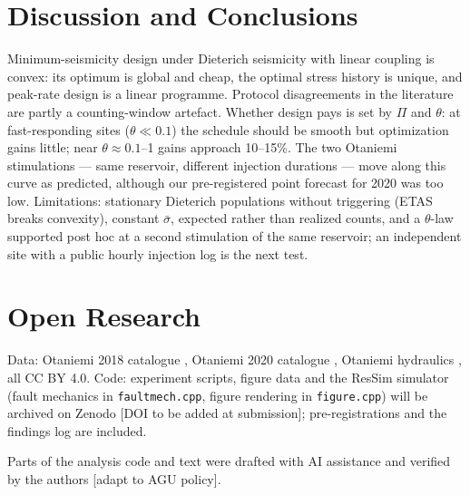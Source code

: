 \documentclass[draft]{agujournal2019}
\begin{document}
\section{Discussion and Conclusions}
Minimum-seismicity design under Dieterich seismicity with linear coupling is convex: its optimum is global and cheap, the optimal stress
history is unique, and peak-rate design is a linear programme. Protocol disagreements in the literature are partly a counting-window
artefact. Whether design pays is set by $\Pi$ and $\theta$: at fast-responding sites ($\theta\ll0.1$) the schedule should be smooth but
optimization gains little; near $\theta\approx0.1$--1 gains approach 10--15\%. The two Otaniemi stimulations --- same reservoir, different
injection durations --- move along this curve as predicted, although our pre-registered point forecast for 2020 was too low. Limitations:
stationary Dieterich populations without triggering (ETAS breaks convexity), constant $\bar\sigma$, expected rather than realized counts,
and a $\theta$-law supported post hoc at a second stimulation of the same reservoir; an independent site with a public hourly injection
log is the next test.

\section*{Open Research}
Data: Otaniemi 2018 catalogue \cite{Leonhardt2021}, Otaniemi 2020 catalogue \cite{Kwiatek2022data}, Otaniemi hydraulics
\cite{Kukkonen2023}, all CC BY 4.0. Code: experiment scripts, figure data and the ResSim simulator (fault
mechanics in \texttt{faultmech.cpp}, figure rendering in \texttt{figure.cpp}) will be archived on Zenodo [DOI to be added at
submission]; pre-registrations and the findings log are included.

\acknowledgments
[Funding.] Parts of the analysis code and text were drafted with AI assistance and verified by the authors [adapt to AGU policy].


\end{document}
